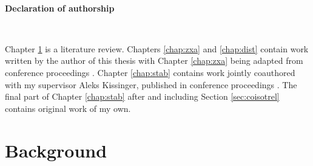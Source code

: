 \documentclass[12pt]{ociamthesis}  %
\begin{document}
%
%
%
%

\

{\bf \large  Declaration of authorship}

\

Chapter \ref{chap:background} is a literature review.  Chapters \ref{chap:zxa} and \ref{chap:dist} contain work written  by the author of this thesis with Chapter \ref{chap:zxa} being adapted from conference proceedings \cite{zxa}.  Chapter \ref{chap:stab} contains work jointly coauthored with my supervisor Aleks Kissinger, published in conference proceedings \cite{lagrel}.  The final part of Chapter  \ref{chap:stab} after and including Section \ref{sec:coisotrel} contains original work of my own.



\chapter{Background}
\label{chap:background}

\end{document}
